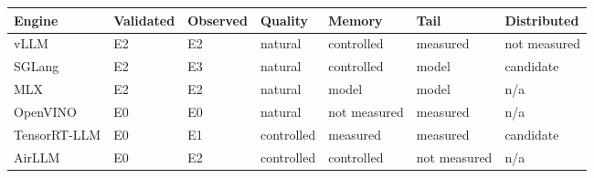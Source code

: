 \begin{tabular}{lllllll}
\toprule
Engine & Validated & Observed & Quality & Memory & Tail & Distributed \\
\midrule
vLLM & E2 & E2 & natural & controlled & measured & not measured \\
SGLang & E2 & E3 & natural & controlled & model & candidate \\
MLX & E2 & E2 & natural & model & model & n/a \\
OpenVINO & E0 & E0 & natural & not measured & measured & n/a \\
TensorRT-LLM & E0 & E1 & controlled & measured & measured & candidate \\
AirLLM & E0 & E2 & controlled & controlled & not measured & n/a \\
\bottomrule
\end{tabular}
